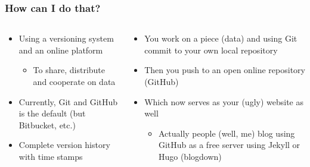 \documentclass[ignorenonframetext]{beamer}
\begin{document}
\begin{frame}
  \frametitle{How can I do that?}
    \begin{columns}
    \begin{column}{.5\textwidth}
      \begin{itemize}
        \item Using a \alert{versioning} system and an online platform
          \begin{itemize}
\item To \alert{share}, \alert{distribute} and \alert{cooperate} on data\newline
          \end{itemize}
          \item Currently, \alert{Git} and \alert{GitHub} is the default (but Bitbucket, etc.)\newline
          \item Complete version history with time stamps\pause
      \end{itemize}
    \end{column}

    \begin{column}{.5\textwidth}
       \begin{itemize}
        \item You work on a piece (data) and using Git \alert{commit} to your own local repository
        \item Then you push to an \alert{open} online repository (GitHub)
        \item Which now serves as your (ugly) website as well
          \begin{itemize}
            \item Actually people (well, me) blog using GitHub as a free server using Jekyll or Hugo (blogdown)
          \end{itemize}
      \end{itemize}
    \end{column}
  \end{columns}
\end{frame}
\end{document}
